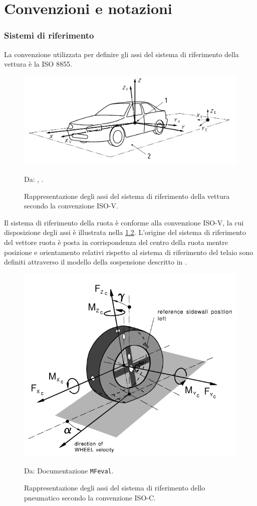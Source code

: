 \chapter{Convenzioni e notazioni}
\label{Notazioni}
%
\subsection{Sistemi di riferimento}
La convenzione utilizzata per definire gli assi del sistema di riferimento della vettura è la \ac{ISO} 8855.

\begin{figure}[h!]
	\centering
	\includegraphics[width=0.8\linewidth]{Figures/iso_convention}
	\caption{Rappresentazione degli assi del sistema di riferimento della vettura secondo la convenzione ISO-V.}
	Da: \citeauthor{Ginebra}, .
	\label{isoconventionv}
\end{figure}

\noindent
Il sistema di riferimento della ruota è conforme alla convenzione \ac{ISO}-V, la cui disposizione degli assi è illustrata nella \figurename{ \ref{isoconventionc}}. L'origine del sistema di riferimento del vettore ruota è posta in corrispondenza del centro della ruota mentre posizione e orientamento relativi rispetto al sistema di riferimento del telaio sono definiti attraverso il modello della sospensione descritto in \cite{Larcher}.

\begin{figure}[h!]
	\centering
	\includegraphics[width=0.6\linewidth]{Figures/iso_convention_wheel}
	\caption{Rappresentazione degli assi  del sistema di riferimento dello pneumatico secondo la convenzione ISO-C.}
	Da: Documentazione \texttt{MFeval}.
	\label{isoconventionc}
\end{figure}
%
